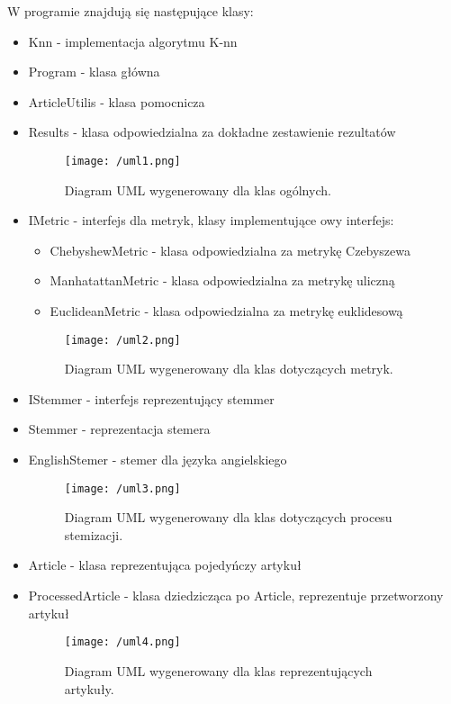\documentclass{classrep}
\begin{document}
W programie znajdują się następujące klasy:
\begin{itemize}[label=$\bullet$]
\item Knn - implementacja algorytmu K-nn
\item Program - klasa główna
\item ArticleUtilis - klasa pomocnicza
\item Results - klasa odpowiedzialna za dokładne zestawienie rezultatów

\begin{figure}[H]
	\centering
	\texttt{[image: /uml1.png]}
	\caption{Diagram UML wygenerowany dla klas ogólnych.}
\end{figure}

\item IMetric - interfejs dla metryk, klasy implementujące owy interfejs:
\begin{itemize}
\item ChebyshewMetric -  klasa odpowiedzialna za metrykę Czebyszewa
\item ManhatattanMetric -  klasa odpowiedzialna za metrykę uliczną
\item EuclideanMetric - klasa odpowiedzialna za metrykę euklidesową\\
\end{itemize}

\begin{figure}[H]
	\centering
	\texttt{[image: /uml2.png]}
	\caption{Diagram UML wygenerowany dla klas dotyczących metryk. }
\end{figure}

\item IStemmer - interfejs reprezentujący stemmer
\item Stemmer - reprezentacja stemera
\item EnglishStemer - stemer dla języka angielskiego

\begin{figure}[H]
	\centering
	\texttt{[image: /uml3.png]}
	\caption{Diagram UML wygenerowany dla klas dotyczących procesu stemizacji.}
\end{figure}

\item Article - klasa reprezentująca pojedyńczy artykuł
\item ProcessedArticle - klasa dziedzicząca po Article, reprezentuje przetworzony artykuł


\begin{figure}[H]
	\centering
	\texttt{[image: /uml4.png]}
	\caption{Diagram UML wygenerowany dla klas reprezentujących artykuły.}
\end{figure}


\end{itemize}
\end{document}

